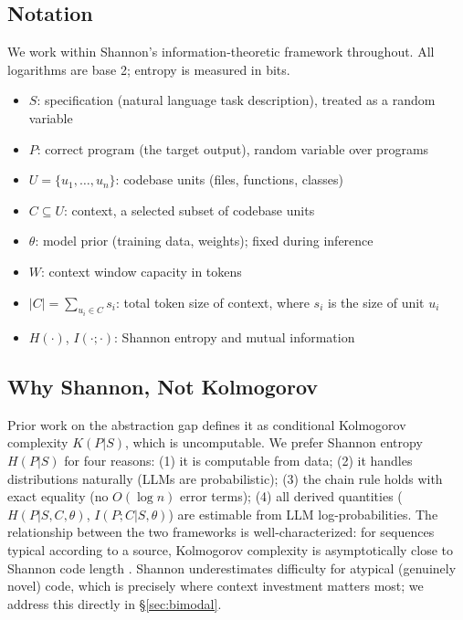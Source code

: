 \documentclass[11pt, a4paper, logo, copyright]{googledeepmind}
\begin{document}
\subsection{Notation}

We work within Shannon's information-theoretic framework throughout. All logarithms are base 2; entropy is measured in bits.

\begin{itemize}[nosep]
    \item $S$: specification (natural language task description), treated as a random variable
    \item $P$: correct program (the target output), random variable over programs
    \item $U = \{u_1, \ldots, u_n\}$: codebase units (files, functions, classes)
    \item $C \subseteq U$: context, a selected subset of codebase units
    \item $\theta$: model prior (training data, weights); fixed during inference
    \item $W$: context window capacity in tokens
    \item $|C| = \sum_{u_i \in C} s_i$: total token size of context, where $s_i$ is the size of unit $u_i$
    \item $H(\cdot)$, $I(\cdot;\cdot)$: Shannon entropy and mutual information
\end{itemize}

\subsection{Why Shannon, Not Kolmogorov}

Prior work on the abstraction gap defines it as conditional Kolmogorov complexity $K(P|S)$, which is uncomputable. We prefer Shannon entropy $H(P|S)$ for four reasons: (1) it is computable from data; (2) it handles distributions naturally (LLMs are probabilistic); (3) the chain rule holds with exact equality (no $O(\log n)$ error terms); (4) all derived quantities ($H(P|S,C,\theta)$, $I(P;C|S,\theta)$) are estimable from LLM log-probabilities. The relationship between the two frameworks is well-characterized: for sequences typical according to a source, Kolmogorov complexity is asymptotically close to Shannon code length \citep{vitanyi2004shannon}. Shannon underestimates difficulty for atypical (genuinely novel) code, which is precisely where context investment matters most; we address this directly in \S\ref{sec:bimodal}.
\end{document}
